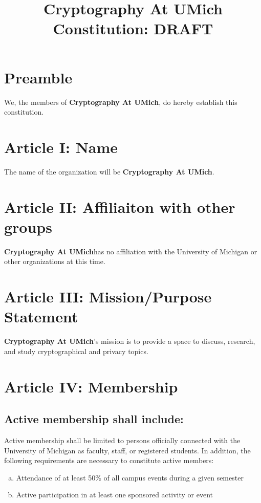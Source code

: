 \documentclass[11pt]{article}
\title{\textbf{Cryptography At UMich Constitution: DRAFT}}
\newcommand{\orgname}{\textbf{Cryptography At UMich}}
\begin{document}
    \maketitle


    \section{Preamble}
    We, the members of \orgname, do hereby establish this constitution.


    \section{Article I: Name}

    The name of the organization will be \orgname.


    \section{Article II: Affiliaiton with other groups}

    \orgname has no affiliation with the University of Michigan or other organizations at this time.


    \section{Article III: Mission/Purpose Statement}

    \orgname 's mission is to provide a space to discuss, research, and study cryptographical and privacy topics.


    \section{Article IV: Membership}

    \subsection{Active membership shall include:}

    Active membership shall be limited to persons officially connected with the University of Michigan as faculty, staff, or registered students.
    In addition, the following requirements are necessary to constitute active members:

    \begin{enumerate}
        [a)]
        \item Attendance of at least 50\% of all campus events during a given semester
        \item Active participation in at least one sponsored activity or event
    \end{enumerate}
\end{document}
